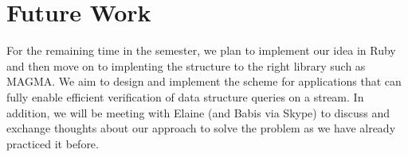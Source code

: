 \documentclass[11pt, letterpaper, oneside]{article}
\begin{document}
\section{Future Work}

For the remaining time in the semester, we plan to implement our idea in Ruby and then move on to implenting the structure to the right library such as MAGMA. We aim to design and implement the scheme for applications that can fully enable efficient verification of data structure queries on a stream. In addition, we will be meeting with Elaine (and Babis via Skype) to discuss and exchange thoughts about our approach to solve the problem as we have already practiced it before.

\end{document}
